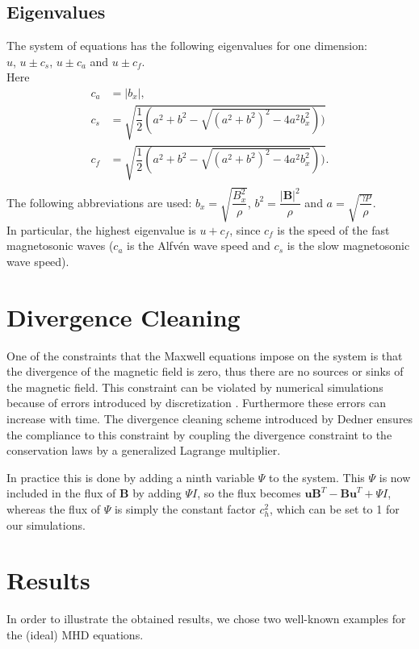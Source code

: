 \documentclass[a4paper]{article}
\begin{document}
\subsection{Eigenvalues}
The system of equations has the following eigenvalues for one dimension\cite{dedner2002hyperbolic}:\\
$u$, $u \pm c_s$, $u \pm c_a$ and $u \pm c_f$. \\
Here 
\begin{align*}
c_a &= |b_x|,\\
c_s &= \sqrt{\dfrac{1}{2}(a^2 + b^2 - \sqrt{(a^2 + b^2)^2 - 4a^2b_x^2}))}\\
c_f &= \sqrt{\dfrac{1}{2}(a^2 + b^2 - \sqrt{(a^2 + b^2)^2 - 4a^2b_x^2}))}.\\
\end{align*}
The following abbreviations are used: $b_x = \sqrt{\dfrac{B_x^2}{\rho}}$, $b^2 = \dfrac{|\textbf{B}|^2}{\rho}$ and $a = \sqrt{\dfrac{\gamma p}{\rho}}$.\\
In particular, the highest eigenvalue is $u + c_f$, since $c_f$ is the speed of the fast magnetosonic waves ($c_a$ is the Alfv\'en wave speed and $c_s$ is the slow magnetosonic wave speed).

\section{Divergence Cleaning}
One of the constraints that the Maxwell equations impose on the system is that
the divergence of the magnetic field is zero, thus there are no sources or sinks
of the magnetic field. This constraint can be violated by numerical simulations
because of errors introduced by discretization \cite{dedner2002hyperbolic}.
Furthermore these errors can increase with time. The divergence cleaning scheme
introduced by Dedner \cite{dedner2002hyperbolic} ensures the compliance to this
constraint by coupling the divergence constraint to the conservation laws by a
generalized Lagrange multiplier.

In practice this is done by adding a ninth variable $\Psi$ to the system. This
$\Psi$ is now included in the flux of $\textbf{B}$ by adding $\Psi I$, so the
flux becomes $\textbf{uB}^T-\textbf{Bu}^T + \Psi I$, whereas the flux of $\Psi$
is simply the constant factor $c_h^2$, which can be set to 1 for our
simulations.
\section{Results}
In order to illustrate the obtained results, we chose two well-known examples
for the (ideal) MHD equations.
\end{document}
